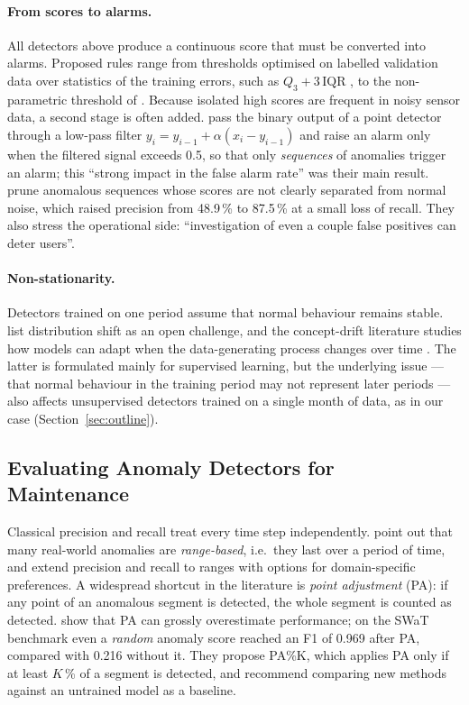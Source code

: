 \paragraph{From scores to alarms.}
All detectors above produce a continuous score that must be converted into alarms. Proposed rules range from thresholds optimised on labelled validation data \citep{malhotra2016lstm} over statistics of the training errors, such as $Q_3 + 3\,\mathrm{IQR}$ \citep{silva2023adversarial,gama2024neurosymbolic}, to the non-parametric threshold of \citet{hundman2018detecting}. Because isolated high scores are frequent in noisy sensor data, a second stage is often added. \citet{ribeiro2016sequential} pass the binary output of a point detector through a low-pass filter $y_i = y_{i-1} + \alpha (x_i - y_{i-1})$ and raise an alarm only when the filtered signal exceeds 0.5, so that only \emph{sequences} of anomalies trigger an alarm; this ``strong impact in the false alarm rate'' was their main result. \citet{hundman2018detecting} prune anomalous sequences whose scores are not clearly separated from normal noise, which raised precision from 48.9\,\% to 87.5\,\% at a small loss of recall. They also stress the operational side: ``investigation of even a couple false positives can deter users''.

\paragraph{Non-stationarity.}
Detectors trained on one period assume that normal behaviour remains stable. \citet{ruff2021unifying} list distribution shift as an open challenge, and the concept-drift literature studies how models can adapt when the data-generating process changes over time \citep{gama2014drift}. The latter is formulated mainly for supervised learning, but the underlying issue --- that normal behaviour in the training period may not represent later periods --- also affects unsupervised detectors trained on a single month of data, as in our case (Section~\ref{sec:outline}).

\subsection{Evaluating Anomaly Detectors for Maintenance}
\label{sec:eval}

Classical precision and recall treat every time step independently. \citet{tatbul2018precision} point out that many real-world anomalies are \emph{range-based}, i.e.\ they last over a period of time, and extend precision and recall to ranges with options for domain-specific preferences. A widespread shortcut in the literature is \emph{point adjustment} (PA): if any point of an anomalous segment is detected, the whole segment is counted as detected. \citet{kim2022rigorous} show that PA can grossly overestimate performance; on the SWaT benchmark even a \emph{random} anomaly score reached an F1 of 0.969 after PA, compared with 0.216 without it. They propose PA\%K, which applies PA only if at least $K$\,\% of a segment is detected, and recommend comparing new methods against an untrained model as a baseline.

